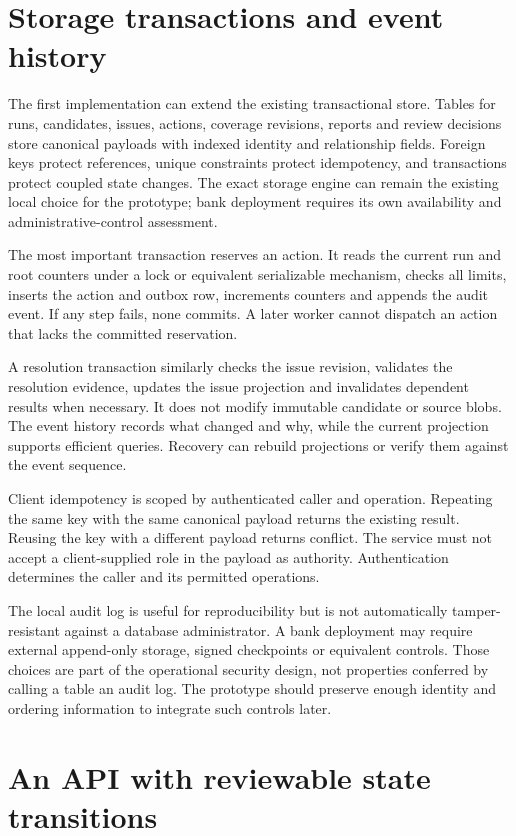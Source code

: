 \documentclass[12pt,a4paper,oneside,openany]{book}
\begin{document}
\section{Storage transactions and event history}

The first implementation can extend the existing transactional store. Tables for
runs, candidates, issues, actions, coverage revisions, reports and review decisions
store canonical payloads with indexed identity and relationship fields. Foreign
keys protect references, unique constraints protect idempotency, and transactions
protect coupled state changes. The exact storage engine can remain the existing
local choice for the prototype; bank deployment requires its own availability and
administrative-control assessment.

The most important transaction reserves an action. It reads the current run and
root counters under a lock or equivalent serializable mechanism, checks all
limits, inserts the action and outbox row, increments counters and appends the
audit event. If any step fails, none commits. A later worker cannot dispatch an
action that lacks the committed reservation.

A resolution transaction similarly checks the issue revision, validates the
resolution evidence, updates the issue projection and invalidates dependent
results when necessary. It does not modify immutable candidate or source blobs.
The event history records what changed and why, while the current projection
supports efficient queries. Recovery can rebuild projections or verify them
against the event sequence.

Client idempotency is scoped by authenticated caller and operation. Repeating the
same key with the same canonical payload returns the existing result. Reusing the
key with a different payload returns conflict. The service must not accept a
client-supplied role in the payload as authority. Authentication determines the
caller and its permitted operations.

The local audit log is useful for reproducibility but is not automatically
 tamper-resistant against a database administrator. A bank deployment may require
external append-only storage, signed checkpoints or equivalent controls. Those
choices are part of the operational security design, not properties conferred by
calling a table an audit log. The prototype should preserve enough identity and
ordering information to integrate such controls later.

\section{An API with reviewable state transitions}
\end{document}
